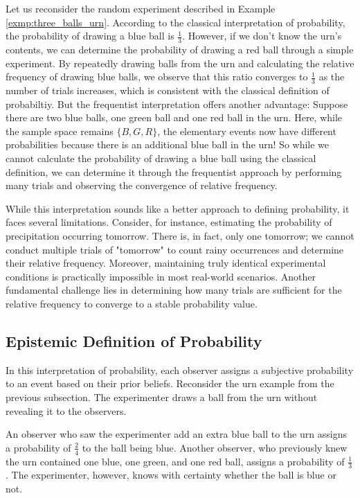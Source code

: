 Let us reconsider the random experiment described in Example \autoref{exmp:three_balls_urn}.
According to the classical interpretation of probability, the probability of drawing a blue ball is \( \frac{1}{3} \).
However, if we don't know the urn's contents, we can determine the probability of drawing a red ball through a simple experiment.
By repeatedly drawing balls from the urn and calculating the relative frequency of drawing blue balls,
we observe that this ratio converges to \( \frac{1}{3} \) as the number of trials increases,
which is consistent with the classical definition of probabiltiy.
But the frequentist interpretation offers another advantage:
Suppose there are two blue balls, one green ball and one red ball in the urn.
Here, while the sample space remains \( \{ B, G, R \} \), the elementary events now have different probabilities
because there is an additional blue ball in the urn!
So while we cannot calculate the probability of drawing a blue ball using the classical definition,
we can determine it through the frequentist approach by performing many trials and observing the convergence of relative frequency.

While this interpretation sounds like a better approach to defining probability,
it faces several limitations. 
Consider, for instance, estimating the probability of precipitation occurring tomorrow.
There is, in fact, only one tomorrow;
we cannot conduct multiple trials of "tomorrow" to count rainy occurrences and determine their relative frequency.
Moreover, maintaining truly identical experimental conditions is practically impossible in most real-world scenarios.
Another fundamental challenge lies in determining how many trials are sufficient for the relative frequency to converge to a stable probability value.

\subsection{Epistemic Definition of Probability}

In this interpretation of probability, each observer assigns a subjective probability to an event based on their prior beliefs.
Reconsider the urn example from the previous subsection.
The experimenter draws a ball from the urn without revealing it to the observers.

An observer who saw the experimenter add an extra blue ball to the urn assigns a probability of \( \frac{2}{4} \) to the ball being blue.
Another observer, who previously knew the urn contained one blue, one green, and one red ball, assigns a probability of \( \frac{1}{3} \).
The experimenter, however, knows with certainty whether the ball is blue or not.

